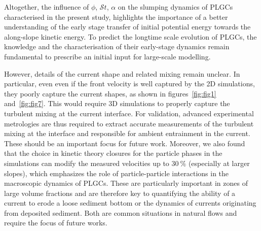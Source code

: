 \documentclass[12pt]{article}
\begin{document}
Altogether, the influence of $\phi$, $\mathcal{S}t$, $\alpha$ on the slumping dynamics of PLGCs characterised in the present study, highlights the importance of a better understanding of the early stage transfer of initial potential energy towards the along-slope kinetic energy. To predict the longtime scale evolution of PLGCs, the knowledge and the characterisation of their early-stage dynamics remain fundamental to prescribe an initial input for large-scale modelling.

However, details of the current shape and related mixing remain unclear. In particular, even even if the front velocity is well captured by the 2D simulations, they poorly capture the current shapes, as shown in figures~\ref{fig:fig1} and~\ref{fig:fig7}. This would require 3D simulations to properly capture the turbulent mixing at the current interface. For validation, advanced experimental metrologies are thus required to extract accurate measurements of the turbulent mixing at the interface and responsible for ambient entrainment in the current. These should be an important focus for future work.
%
Moreover, we also found that the choice in kinetic theory closures for the particle phases in the simulations can modify the measured velocities up to $30~\%$ (especially at larger slopes), which emphasizes the role of particle-particle interactions in the macroscopic dynamics of PLGCs. These are particularly important in zones of large volume fractions and are therefore key to quantifying the ability of a current to erode a loose sediment bottom or the dynamics of currents originating from deposited sediment. Both are common situations in natural flows and require the focus of future works.



\end{document}
